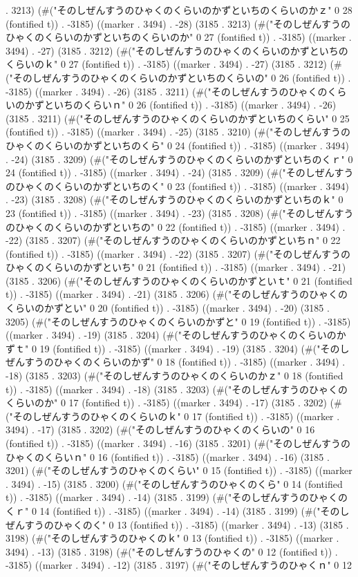 . 3213) (#("そのしぜんすうのひゃくのくらいのかずといちのくらいのかｚ" 0 28 (fontified t)) . -3185) ((marker . 3494) . -28) (3185 . 3213) (#("そのしぜんすうのひゃくのくらいのかずといちのくらいのか" 0 27 (fontified t)) . -3185) ((marker . 3494) . -27) (3185 . 3212) (#("そのしぜんすうのひゃくのくらいのかずといちのくらいのｋ" 0 27 (fontified t)) . -3185) ((marker . 3494) . -27) (3185 . 3212) (#("そのしぜんすうのひゃくのくらいのかずといちのくらいの" 0 26 (fontified t)) . -3185) ((marker . 3494) . -26) (3185 . 3211) (#("そのしぜんすうのひゃくのくらいのかずといちのくらいｎ" 0 26 (fontified t)) . -3185) ((marker . 3494) . -26) (3185 . 3211) (#("そのしぜんすうのひゃくのくらいのかずといちのくらい" 0 25 (fontified t)) . -3185) ((marker . 3494) . -25) (3185 . 3210) (#("そのしぜんすうのひゃくのくらいのかずといちのくら" 0 24 (fontified t)) . -3185) ((marker . 3494) . -24) (3185 . 3209) (#("そのしぜんすうのひゃくのくらいのかずといちのくｒ" 0 24 (fontified t)) . -3185) ((marker . 3494) . -24) (3185 . 3209) (#("そのしぜんすうのひゃくのくらいのかずといちのく" 0 23 (fontified t)) . -3185) ((marker . 3494) . -23) (3185 . 3208) (#("そのしぜんすうのひゃくのくらいのかずといちのｋ" 0 23 (fontified t)) . -3185) ((marker . 3494) . -23) (3185 . 3208) (#("そのしぜんすうのひゃくのくらいのかずといちの" 0 22 (fontified t)) . -3185) ((marker . 3494) . -22) (3185 . 3207) (#("そのしぜんすうのひゃくのくらいのかずといちｎ" 0 22 (fontified t)) . -3185) ((marker . 3494) . -22) (3185 . 3207) (#("そのしぜんすうのひゃくのくらいのかずといち" 0 21 (fontified t)) . -3185) ((marker . 3494) . -21) (3185 . 3206) (#("そのしぜんすうのひゃくのくらいのかずといｔ" 0 21 (fontified t)) . -3185) ((marker . 3494) . -21) (3185 . 3206) (#("そのしぜんすうのひゃくのくらいのかずとい" 0 20 (fontified t)) . -3185) ((marker . 3494) . -20) (3185 . 3205) (#("そのしぜんすうのひゃくのくらいのかずと" 0 19 (fontified t)) . -3185) ((marker . 3494) . -19) (3185 . 3204) (#("そのしぜんすうのひゃくのくらいのかずｔ" 0 19 (fontified t)) . -3185) ((marker . 3494) . -19) (3185 . 3204) (#("そのしぜんすうのひゃくのくらいのかず" 0 18 (fontified t)) . -3185) ((marker . 3494) . -18) (3185 . 3203) (#("そのしぜんすうのひゃくのくらいのかｚ" 0 18 (fontified t)) . -3185) ((marker . 3494) . -18) (3185 . 3203) (#("そのしぜんすうのひゃくのくらいのか" 0 17 (fontified t)) . -3185) ((marker . 3494) . -17) (3185 . 3202) (#("そのしぜんすうのひゃくのくらいのｋ" 0 17 (fontified t)) . -3185) ((marker . 3494) . -17) (3185 . 3202) (#("そのしぜんすうのひゃくのくらいの" 0 16 (fontified t)) . -3185) ((marker . 3494) . -16) (3185 . 3201) (#("そのしぜんすうのひゃくのくらいｎ" 0 16 (fontified t)) . -3185) ((marker . 3494) . -16) (3185 . 3201) (#("そのしぜんすうのひゃくのくらい" 0 15 (fontified t)) . -3185) ((marker . 3494) . -15) (3185 . 3200) (#("そのしぜんすうのひゃくのくら" 0 14 (fontified t)) . -3185) ((marker . 3494) . -14) (3185 . 3199) (#("そのしぜんすうのひゃくのくｒ" 0 14 (fontified t)) . -3185) ((marker . 3494) . -14) (3185 . 3199) (#("そのしぜんすうのひゃくのく" 0 13 (fontified t)) . -3185) ((marker . 3494) . -13) (3185 . 3198) (#("そのしぜんすうのひゃくのｋ" 0 13 (fontified t)) . -3185) ((marker . 3494) . -13) (3185 . 3198) (#("そのしぜんすうのひゃくの" 0 12 (fontified t)) . -3185) ((marker . 3494) . -12) (3185 . 3197) (#("そのしぜんすうのひゃくｎ" 0 12 